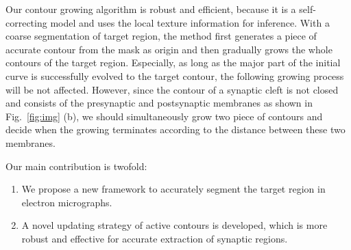 Our contour growing algorithm is robust and efficient, because it is a self-correcting model and uses the local texture information for inference.
With a coarse segmentation of target region, the method first generates a piece of accurate contour from the mask as origin and then gradually grows the whole contours of the target region.
Especially, as long as the major part of the initial curve is successfully evolved to the target contour, the following growing process will be not affected.
%
However, since the contour of a synaptic cleft is not closed and consists of the presynaptic and postsynaptic membranes as shown in Fig.~\ref{fig:img} (b), we should simultaneously grow two piece of contours and decide when the growing terminates according to the distance between these two membranes.


Our main contribution is twofold:
\begin{enumerate}
	\item We propose a new framework to accurately segment the target region in electron micrographs.
	\item A novel updating strategy of active contours is developed, which is more robust and effective for accurate extraction of synaptic regions.
\end{enumerate}
